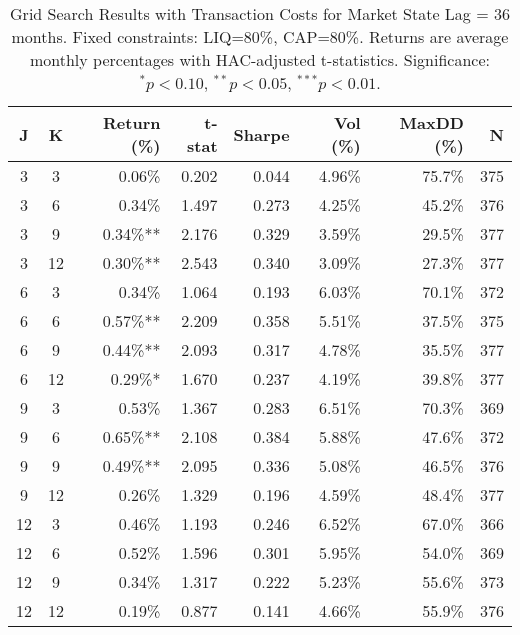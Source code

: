 \begin{table}[htbp]
\caption{Grid Search Results with Transaction Costs for Market State Lag = 36 months. Fixed constraints: LIQ=80\%, CAP=80\%. Returns are average monthly percentages with HAC-adjusted t-statistics. Significance: $^{*}p<0.10$, $^{**}p<0.05$, $^{***}p<0.01$.}
\label{tab:grid_costs_lag36}
\begin{tabular}{cc|rrrrrr}
\toprule
J & K & Return (\%) & t-stat & Sharpe & Vol (\%) & MaxDD (\%) & N \\
\midrule
3 & 3 & 0.06\% & 0.202 & 0.044 & 4.96\% & 75.7\% & 375 \\
3 & 6 & 0.34\% & 1.497 & 0.273 & 4.25\% & 45.2\% & 376 \\
3 & 9 & 0.34\%** & 2.176 & 0.329 & 3.59\% & 29.5\% & 377 \\
3 & 12 & 0.30\%** & 2.543 & 0.340 & 3.09\% & 27.3\% & 377 \\
6 & 3 & 0.34\% & 1.064 & 0.193 & 6.03\% & 70.1\% & 372 \\
6 & 6 & 0.57\%** & 2.209 & 0.358 & 5.51\% & 37.5\% & 375 \\
6 & 9 & 0.44\%** & 2.093 & 0.317 & 4.78\% & 35.5\% & 377 \\
6 & 12 & 0.29\%* & 1.670 & 0.237 & 4.19\% & 39.8\% & 377 \\
9 & 3 & 0.53\% & 1.367 & 0.283 & 6.51\% & 70.3\% & 369 \\
9 & 6 & 0.65\%** & 2.108 & 0.384 & 5.88\% & 47.6\% & 372 \\
9 & 9 & 0.49\%** & 2.095 & 0.336 & 5.08\% & 46.5\% & 376 \\
9 & 12 & 0.26\% & 1.329 & 0.196 & 4.59\% & 48.4\% & 377 \\
12 & 3 & 0.46\% & 1.193 & 0.246 & 6.52\% & 67.0\% & 366 \\
12 & 6 & 0.52\% & 1.596 & 0.301 & 5.95\% & 54.0\% & 369 \\
12 & 9 & 0.34\% & 1.317 & 0.222 & 5.23\% & 55.6\% & 373 \\
12 & 12 & 0.19\% & 0.877 & 0.141 & 4.66\% & 55.9\% & 376 \\
\bottomrule
\end{tabular}
\end{table}
